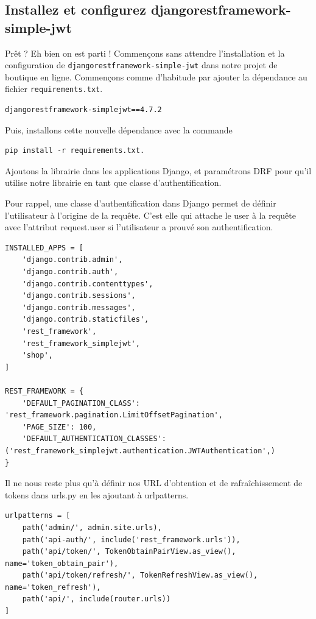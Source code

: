 \subsection{Installez et configurez djangorestframework-simple-jwt}
Prêt ? Eh bien on est parti ! Commençons sans attendre l’installation et la configuration de {\tt djangorestframework-simple-jwt}  dans notre projet de boutique en ligne. Commençons comme d’habitude par ajouter la dépendance au fichier {\tt requirements.txt}.
\begin{verbatim}
djangorestframework-simplejwt==4.7.2
\end{verbatim}
Puis, installons cette nouvelle dépendance avec la commande 
\begin{verbatim}
pip install -r requirements.txt.
\end{verbatim}
Ajoutons la librairie dans les applications Django, et paramétrons DRF pour qu’il utilise notre librairie en tant que classe d’authentification.
\begin{theorem}
Pour rappel, une classe d’authentification dans Django permet de définir l’utilisateur à l’origine de la requête. C’est elle qui attache le user  à la requête avec l’attribut request.user  si l'utilisateur a prouvé son authentification.
\end{theorem}
\begin{verbatim}
INSTALLED_APPS = [
    'django.contrib.admin',
    'django.contrib.auth',
    'django.contrib.contenttypes',
    'django.contrib.sessions',
    'django.contrib.messages',
    'django.contrib.staticfiles',
    'rest_framework',
    'rest_framework_simplejwt',
    'shop',
]
 
REST_FRAMEWORK = {
    'DEFAULT_PAGINATION_CLASS': 'rest_framework.pagination.LimitOffsetPagination',
    'PAGE_SIZE': 100,
    'DEFAULT_AUTHENTICATION_CLASSES': ('rest_framework_simplejwt.authentication.JWTAuthentication',)
}
\end{verbatim}
Il ne nous reste plus qu’à définir nos URL d’obtention et de rafraîchissement de tokens dans urls.py  en les ajoutant à urlpatterns.
\begin{verbatim}
urlpatterns = [
    path('admin/', admin.site.urls),
    path('api-auth/', include('rest_framework.urls')),
    path('api/token/', TokenObtainPairView.as_view(), name='token_obtain_pair'),
    path('api/token/refresh/', TokenRefreshView.as_view(), name='token_refresh'),
    path('api/', include(router.urls))
]
\end{verbatim}
